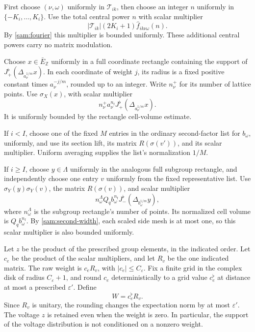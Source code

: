 First choose \((\nu,\omega)\) uniformly in
\(\mathcal T_{ik}\), then choose an integer \(n\) uniformly in
\(\{-K_i,\ldots,K_i\}\).  Use the total central power \(n\)
with scalar multiplier
\[
 |\mathcal T_{ik}|(2K_i+1)\widehat f_{ik\nu\omega}(n).
\]
By \eqref{sam:fourier} this multiplier is bounded uniformly.
These additional central powers carry no matrix modulation.

Choose \(x\in\bar E_{\mathbb Z}\) uniformly in a full coordinate
rectangle containing the support of
\(J_+^\flat(\Delta_{a_\nu^{1/m}}x)\).  In each coordinate of
weight \(j\), its radius is a fixed positive constant times
\(a_\nu^{-j/m}\), rounded up to an integer.  Write \(n_\nu^+\)
for its number of lattice points.  Use \(\sigma_X(x)\), with
scalar multiplier
\[
 n_\nu^+ a_\nu^{n_{\mathrm f}}
 J_+^\flat(\Delta_{a_\nu^{1/m}}x).
\]
It is uniformly bounded by the rectangle cell-volume estimate.

If \(i<I\), choose one of the fixed \(M\) entries in the ordinary
second-factor list for \(b_\omega\), uniformly, and use its section
lift, its matrix \(R(\sigma(v'))\), and its scalar multiplier.
Uniform averaging supplies the list's normalization \(1/M\).

If \(i\ge I\), choose \(y\in\Lambda\) uniformly in the analogous
full subgroup rectangle, and independently choose one entry \(v\)
uniformly from the fixed representative list.  Use
\(\sigma_Y(y)\sigma_Y(v)\), the matrix \(R(\sigma(v))\), and
scalar multiplier
\[
 n_\omega^\Lambda Q_q b_\omega^{n_{\mathrm f}}
 J_-^\flat(\Delta_{b_\omega^{1/m}}y),
\]
where \(n_\omega^\Lambda\) is the subgroup rectangle's number of
points.  Its normalized cell volume is
\(Q_q b_\omega^{n_{\mathrm f}}\).  By
\eqref{sam:second-width}, each scaled side mesh is at most one,
so this scalar multiplier is also bounded uniformly.

Let \(z\) be the product of the prescribed group elements, in the
indicated order.  Let \(c_e\) be the product of the scalar
multipliers, and let \(R_v\) be the one indicated matrix.  The raw
weight is \(c_eR_v\), with \(|c_e|\le C_\varepsilon\).  Fix a finite
grid in the complex disk of radius \(C_\varepsilon+1\), and round
\(c_e\) deterministically to a grid value \(c_e^\flat\) at distance
at most a prescribed \(\varepsilon'\).  Define
\[
 W=c_e^\flat R_v.
\]
Since \(R_v\) is unitary, the rounding changes the expectation
norm by at most \(\varepsilon'\).  The voltage \(z\) is retained
even when the weight is zero.  In particular, the support of the
voltage distribution is not conditioned on a nonzero weight.

